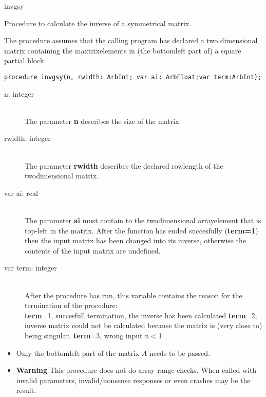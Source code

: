 \documentclass{report}
\newcommand{\FunctionDescription}{\item[Description]\rmfamily}
\newcommand{\Dataorganisation}{\item[Data Struct]\rmfamily}
\newcommand{\DeclarationandParams}{\item[Declaration]\rmfamily}
\newcommand{\Remarks}{\item[Remarks]\rmfamily}
\begin{document}
\begin{procedure}{invgsy}

\FunctionDescription

Procedure to calculate the inverse of a symmetrical matrix.

\Dataorganisation

The procedure assumes that the calling program has declared a two
dimensional matrix containing the maxtrixelements in (the bottomleft part
of) a square partial block.

\DeclarationandParams

\lstinline|procedure invgsy(n, rwidth: ArbInt; var ai: ArbFloat;var term:ArbInt);|

\begin{description}
 \item[n: integer] \mbox{ } \\
    The parameter {\bf n} describes the size of the matrix
 \item[rwidth: integer] \mbox{} \\
    The parameter {\bf rwidth} describes the declared rowlength of the twodimensional
    matrix.
 \item[var ai: real] \mbox{} \\
    The parameter {\bf ai} must contain to the twodimensional arrayelement
    that is top-left in the matrix.
    After the function has ended succesfully (\textbf{term=1}) then
    the input matrix has been changed into its inverse, otherwise the contents
    of the input matrix are undefined.
 \item[var term: integer]  \mbox{} \\
    After the procedure has run, this variable contains the reason for
    the termination of the procedure:\\
      {\bf term}=1, succesfull termination, the inverse has been calculated
      {\bf term}=2, inverse matrix could not be calculated because the matrix
                    is (very close to) being singular.
      {\bf term}=3, wrong input n$<$1

\end{description}

\Remarks
\begin{itemize}
\item Only the bottomleft part of the matrix $A$ needs to be passed.
\item \textbf{Warning} This procedure does not do array range checks. When called with invalid
parameters, invalid/nonsense responses or even crashes may be the result.
\end{itemize}


\end{procedure}
\end{document}
